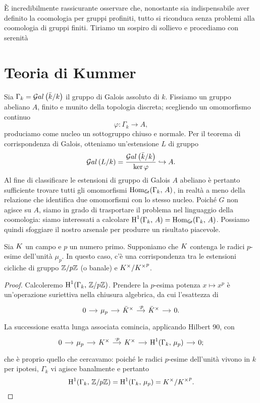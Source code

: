 \begin{profinite}
	È incredibilmente rassicurante osservare che, nonostante sia indispensabile aver definito la coomologia per gruppi profiniti, tutto si riconduca senza problemi alla coomologia di gruppi finiti. Tiriamo un sospiro di sollievo e procediamo con serenità
\end{profinite}

\section{Teoria di Kummer}


Sia $ \Gamma_k = \mathcal{G}al\left( \bar{k}/ k \right) $ il gruppo di Galois assoluto di $ k $. Fissiamo un gruppo abeliano $ A $, finito e munito della topologia discreta; scegliendo un omomorfismo continuo
\[ \varphi \colon \Gamma_k \to A, \]
produciamo come nucleo un sottogruppo chiuso e normale. Per il teorema di corrispondenza di Galois, otteniamo un'estensione $ L $ di gruppo
\[ \mathcal{G}al\left( L/k \right) = \frac{\mathcal{G}al\left( \bar{k}/ k \right)}{\ker \varphi} \hookrightarrow A. \]
Al fine di classificare le estensioni di gruppo di Galois $ A $ abeliano è pertanto sufficiente trovare tutti gli omomorfismi $ \operatorname{Hom}_{\textsf{Gr}}(\Gamma_k, \, A) $, in realtà a meno della relazione che identifica due omomorfismi con lo stesso nucleo. Poiché $ G $ non agisce su $ A $, siamo in grado di trasportare il problema nel linguaggio della coomologia: siamo interessati a calcolare $ \operatorname{H}^1(\Gamma_k, \, A) = \operatorname{Hom}_{\textsf{Gr}}(\Gamma_k, \, A) $. Possiamo quindi sfoggiare il nostro arsenale per produrre un risultato piacevole.

\begin{theorem}[di Kummer]
	Sia $ K $ un campo e $ p $ un numero primo. Supponiamo che $ K $ contenga le radici $ p $-esime dell'unità $ \mu_p $. In questo caso, c'è una corrispondenza tra le estensioni cicliche di gruppo $ \mathbb{Z}/p\mathbb{Z} $ (o banale) e $ K^\times / {K^\times}^p $.
\end{theorem}
\begin{proof}
	Calcoleremo $ \operatorname{H}^1(\Gamma_k, \, \mathbb{Z}/p\mathbb{Z}) $. Prendere la $ p $-esima potenza $ x \mapsto x^p $ è un'operazione suriettiva nella chiusura algebrica, da cui l'esattezza di
	\[\begin{tikzcd}[column sep = small]
	0 \rar
	& \mu_p \rar
	& \bar{\K}^\times \rar["\cdot p"]
	& \bar{\K}^\times \rar
	& 0.
	\end{tikzcd}  \]
	La successione esatta lunga associata comincia, applicando Hilbert 90, con
	\[\begin{tikzcd}[column sep = small]
	0 \rar
	& \mu_p \rar
	& \K^\times \rar["\cdot p"]
	& \K^\times \rar
	& \HH^1(\Gamma_k, \, \mu_p) \rar
	& 0;
	\end{tikzcd}  \]
	che è proprio quello che cercavamo: poiché le radici $ p $-esime dell'unità vivono in $ k $ per ipotesi, $ \Gamma_k $ vi agisce banalmente e pertanto
	\[ \operatorname{H}^1(\Gamma_k, \, \mathbb{Z}/p\mathbb{Z}) = \operatorname{H}^1(\Gamma_k, \, \mu_p) =K^\times / {K^\times}^p . \]
\end{proof}


